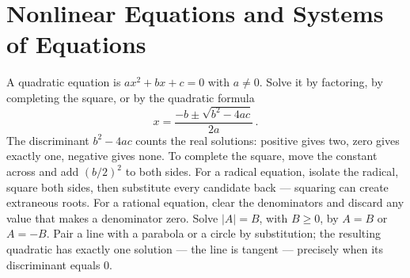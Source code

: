 \chapter{Nonlinear Equations and Systems of Equations}

\begin{essentials}
A quadratic equation is $ax^2+bx+c=0$ with $a\neq 0$. Solve it by factoring,
by completing the square, or by the quadratic formula
\[ x=\dfrac{-b\pm\sqrt{b^2-4ac}}{2a}\,. \]
The discriminant $b^2-4ac$ counts the real solutions: positive gives two, zero
gives exactly one, negative gives none. To complete the square, move the
constant across and add $(b/2)^2$ to both sides. For a radical equation,
isolate the radical, square both sides, then substitute every candidate back
--- squaring can create extraneous roots. For a rational equation, clear the
denominators and discard any value that makes a denominator zero. Solve
$|A|=B$, with $B\ge 0$, by $A=B$ or $A=-B$. Pair a line with a parabola or a
circle by substitution; the resulting quadratic has exactly one solution ---
the line is tangent --- precisely when its discriminant equals $0$.
\end{essentials}

